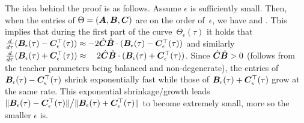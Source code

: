 \begin{sproof}
The idea behind the proof is as follows.
Assume $\epsilon$ is sufficiently small.
Then, when the entries of $\Theta = ( {\bm{A}} , {\bm{B}} , {\bm{C}})$ are on the order of~$\epsilon$, we have  and .
This implies that during the first part of the curve~$\Theta_\epsilon ( \tau )$ it holds that
$\tfrac{d}{d \tau} ( {\bm{B}}_\epsilon ( \tau ) - {\bm{C}}_\epsilon^\top ( \tau ) ) \approx - 2 \hat{{\bm{C}}} \hat{{\bm{B}}} \cdot ( {\bm{B}}_\epsilon ( \tau ) - {\bm{C}}_\epsilon^\top ( \tau ) )$
and similarly
$\tfrac{d}{d \tau} ( {\bm{B}}_\epsilon ( \tau ) + {\bm{C}}_\epsilon^\top ( \tau ) ) \approx ~~~ 2 \hat{{\bm{C}}} \hat{{\bm{B}}} \cdot ( {\bm{B}}_\epsilon ( \tau ) + {\bm{C}}_\epsilon^\top ( \tau ) )$.
Since $\hat{{\bm{C}}} \hat{{\bm{B}}} > 0$ (follows from the teacher parameters being balanced and non-degenerate), the entries of ${\bm{B}}_\epsilon ( \tau ) - {\bm{C}}_\epsilon^\top ( \tau )$ shrink exponentially fast while those of ${\bm{B}}_\epsilon ( \tau ) + {\bm{C}}_\epsilon^\top ( \tau )$ grow at the same rate.
This exponential shrinkage/growth leads $\| {\bm{B}}_\epsilon ( \tau ) - {\bm{C}}_\epsilon^\top ( \tau ) \| \big/ \| {\bm{B}}_\epsilon ( \tau ) + {\bm{C}}_\epsilon^\top ( \tau ) \|$ to become extremely small, more so the smaller $\epsilon$ is.
%
\end{sproof}